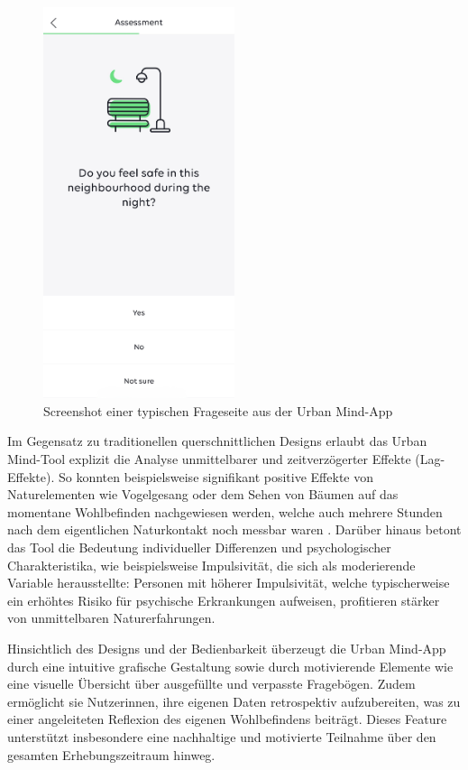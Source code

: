 \begin{figure}[htbp]
    \centering
    \includegraphics[width=0.5\textwidth]{Arbeit/images/urban_mind01.jpeg}
    \caption{Screenshot einer typischen Frageseite aus der Urban Mind-App}
    \label{fig:urban_mind_screenshot_1}
\end{figure}

Im Gegensatz zu traditionellen querschnittlichen Designs erlaubt das Urban Mind-Tool explizit die Analyse unmittelbarer und zeitverzögerter Effekte (Lag-Effekte). So konnten beispielsweise signifikant positive Effekte von Naturelementen wie Vogelgesang oder dem Sehen von Bäumen auf das momentane Wohlbefinden nachgewiesen werden, welche auch mehrere Stunden nach dem eigentlichen Naturkontakt noch messbar waren \parencite{bakolisUrbanMindUsing2018}. Darüber hinaus betont das Tool die Bedeutung individueller Differenzen und psychologischer Charakteristika, wie beispielsweise Impulsivität, die sich als moderierende Variable herausstellte: Personen mit höherer Impulsivität, welche typischerweise ein erhöhtes Risiko für psychische Erkrankungen aufweisen, profitieren stärker von unmittelbaren Naturerfahrungen.

Hinsichtlich des Designs und der Bedienbarkeit überzeugt die Urban Mind-App durch eine intuitive grafische Gestaltung sowie durch motivierende Elemente wie eine visuelle Übersicht über ausgefüllte und verpasste Fragebögen. Zudem ermöglicht sie Nutzer\:innen, ihre eigenen Daten retrospektiv aufzubereiten, was zu einer angeleiteten Reflexion des eigenen Wohlbefindens beiträgt. Dieses Feature unterstützt insbesondere eine nachhaltige und motivierte Teilnahme über den gesamten Erhebungszeitraum hinweg.

